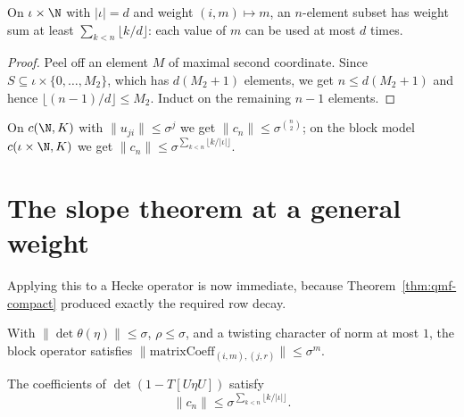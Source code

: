 \begin{lemma}
  \label{lem:block-weight}
  \leanok
  On $\iota \times \N$ with $\lvert \iota \rvert = d$ and weight $(i, m) \mapsto m$, an
  $n$-element subset has weight sum at least $\sum_{k < n} \lfloor k/d \rfloor$: each value of
  $m$ can be used at most $d$ times.
\end{lemma}

\begin{proof}
  \leanok
  Peel off an element $M$ of maximal second coordinate.  Since $S \subseteq \iota \times \{0,
  \dots, M_2\}$, which has $d(M_2+1)$ elements, we get $n \leq d(M_2+1)$ and hence $\lfloor
  (n-1)/d\rfloor \leq M_2$.  Induct on the remaining $n-1$ elements.
\end{proof}

\begin{corollary}
  \label{cor:slope-bound-block}
  \leanok
  On $c(\N, K)$ with $\lVert u_{ji}\rVert \leq \sigma^j$ we get $\lVert c_n \rVert \leq
  \sigma^{\binom{n}{2}}$; on the block model $c(\iota \times \N, K)$ we get $\lVert c_n \rVert
  \leq \sigma^{\sum_{k<n} \lfloor k/\lvert\iota\rvert\rfloor}$.
\end{corollary}

\section{The slope theorem at a general weight}

Applying this to a Hecke operator is now immediate, because
Theorem~\ref{thm:qmf-compact} produced exactly the required row decay.

\begin{proposition}
  \label{prop:qmf-row-decay}
  \leanok
  With $\lVert \det\theta(\eta)\rVert \leq \sigma$, $\rho \leq \sigma$, and a twisting character
  of norm at most $1$, the block operator satisfies $\lVert \mathrm{matrixCoeff}_{(i,m),(j,r)}
  \rVert \leq \sigma^{m}$.
\end{proposition}

\begin{theorem}
  \label{thm:qmf-slope-bound}
  \leanok
  The coefficients of $\det(1 - T[U\eta U])$ satisfy
  \[
    \lVert c_n \rVert \leq \sigma^{\sum_{k < n}\lfloor k/\lvert \iota\rvert\rfloor}.
  \]
\end{theorem}

